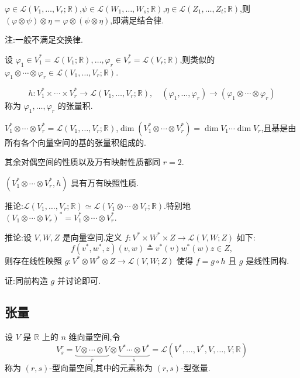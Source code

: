 \begin{proposition}
$\varphi \in \mathcal{L}(V_1, \ldots, V_r; \mathbb{R})$,$\psi \in \mathcal{L}(W_1, \ldots, W_s; \mathbb{R})$,$\eta \in \mathcal{L}(Z_1, \ldots, Z_t; \mathbb{R})$,则 $(\varphi \otimes \psi) \otimes \eta = \varphi \otimes (\psi \otimes \eta)$,即满足结合律.
\end{proposition}

注:一般不满足交换律.

设 $\varphi_1 \in V_1^* = \mathcal{L}(V_1; \mathbb{R}), \ldots, \varphi_r \in V_r^* = \mathcal{L}(V_r; \mathbb{R})$,则类似的 $\varphi_1 \otimes \cdots \otimes \varphi_r \in \mathcal{L}(V_1, \ldots, V_r; \mathbb{R})$.

\[
h : V_1^* \times \cdots \times V_r^* \rightarrow \mathcal{L}(V_1, \ldots, V_r; \mathbb{R}), \quad (\varphi_1, \ldots, \varphi_r) \rightarrow (\varphi_1 \otimes \cdots \otimes \varphi_r)
\]
称为 $\varphi_1, \ldots, \varphi_r$ 的张量积.

\begin{proposition}
$V_1^* \otimes \cdots \otimes V_r^* = \mathcal{L}(V_1, \ldots, V_r; \mathbb{R})$,$\dim(V_1^* \otimes \cdots \otimes V_r^*) = \dim V_1 \cdots \dim V_r$,且基是由所有各个向量空间的基的张量积组成的.
\end{proposition}

其余对偶空间的性质以及万有映射性质都同 $r = 2$.

\begin{theorem}
$(V_1^* \otimes \cdots \otimes V_r^*, h)$ 具有万有映照性质.
\end{theorem}

推论:$\mathcal{L}(V_1, \ldots, V_r; \mathbb{R}) \simeq \mathcal{L}(V_1 \otimes \cdots \otimes V_r; \mathbb{R})$.特别地 $(V_1 \otimes \cdots \otimes V_r)^* = V_1^* \otimes \cdots \otimes V_r^*$.

推论:设 $V, W, Z$ 是向量空间.定义 $f : V^* \times W^* \times Z \rightarrow \mathcal{L}(V, W; Z)$ 如下:
\[
f(v^*, w^*, z)(v, w) \triangleq v^*(v)w^*(w)z \in Z,
\]
则存在线性映照 $g : V^* \otimes W^* \otimes Z \rightarrow \mathcal{L}(V, W; Z)$ 使得 $f = g \circ h$ 且 $g$ 是线性同构.

证:同前构造 $g$ 并讨论即可.

\subsection{张量}

设 $V$ 是 $\mathbb{R}$ 上的 $n$ 维向量空间,令
\[
V_s^r = \underbrace{V \otimes \cdots \otimes V}_{r} \otimes \underbrace{V^* \cdots \otimes V^*}_{s} = \mathcal{L}(V^*, \ldots, V^*, V, \ldots, V; \mathbb{R})
\]
称为 $(r, s)$-型向量空间,其中的元素称为 $(r, s)$-型张量.

